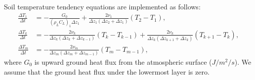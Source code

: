 Soil temperature tendency equations are implemented as follows:
\begin{align}
  \frac{\Delta T_{1}}{\Delta t} &= - \frac{G_{0}}{(\rho_{L}C_{L})_{1}\Delta z_{1}} + \frac{2\nu_{1}}{\Delta z_{1}(\Delta z_{2}+\Delta z_{1})} (T_{2}-T_{1}), \\
  \frac{\Delta T_{k}}{\Delta t} &= - \frac{2\nu_{k}}{\Delta z_{k}(\Delta z_{k}+\Delta z_{k-1})} (T_{k}-T_{k-1}) + \frac{2\nu_{k}}{\Delta z_{k}(\Delta z_{k+1}+\Delta z_{k})} (T_{k+1}-T_{k}), \\
  \frac{\Delta T_{m}}{\Delta t} &= - \frac{2\nu_{m}}{\Delta z_{m}(\Delta z_{m}+\Delta z_{m-1})} (T_{m}-T_{m-1}),
\end{align}
where $G_{0}$ is upward ground heat flux from the atmospheric surface ($J/m^2/s$).
We assume that the ground heat flux under the lowermost layer is zero.

